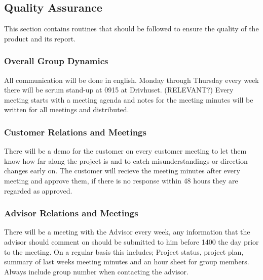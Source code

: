 \subsection{Quality Assurance}

This section contains routines that should be followed to ensure the 
quality of the product and its report.

\subsubsection{Overall Group Dynamics}

All communication will be done in english.
Monday through Thursday every week there will be scrum stand-up at 0915 at Drivhuset. (RELEVANT?)
Every meeting starts with a meeting agenda and notes for the meeting minutes will be
written for all meetings and distributed.

\subsubsection{Customer Relations and Meetings}

There will be a demo for the customer on every customer meeting to let them
know how far along the project is and to catch misunderstandings or direction changes early on.
The customer will recieve the meeting minutes after every meeting and approve them, 
if there is no response within 48 hours they are regarded as approved.

\subsubsection{Advisor Relations and Meetings}

There will be a meeting with the Advisor every week, any information that the advisor
should comment on should be submitted to him before 1400 the day prior to the meeting.
On a regular basis this includes; Project status, project plan, summary of last weeks meeting minutes and an hour sheet for group members.
Always include group number when contacting the advisor.
